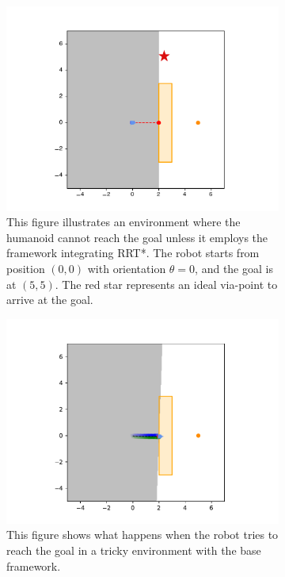 \begin{figure}[H]
\begin{subfigure}{0.49\textwidth}
    \includegraphics[width=\linewidth]{figures//Simulations//sim_rrt/env_redstar.pdf}
        \caption{This figure illustrates an environment where the humanoid cannot reach the goal unless it employs the framework integrating RRT*. The robot starts from position $(0,0)$ with orientation $\theta=0$, and the goal is at $(5,5)$. The red star represents an ideal via-point to arrive at the goal.}
    \label{fig:sim_rrt_env-red-star}
\end{subfigure}
\hfill
\begin{subfigure}{0.49\textwidth}
    \includegraphics[width=\linewidth]{figures//Simulations//sim_rrt/no_rrt_end.pdf}
        \caption{This figure shows what happens when the robot tries to reach the goal in a tricky environment with the base framework.}
    \label{fig:sim_rrt_no_rrt_end}
\end{subfigure}
\caption{}
\end{figure}

